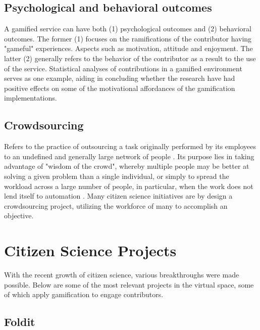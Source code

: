 \subsection{Psychological and behavioral outcomes}

A gamified service can have both (1) psychological outcomes and (2) behavioral outcomes. The former (1) focuses on the ramifications of the contributor having "gameful" experiences. Aspects such as motivation, attitude and enjoyment. The latter (2) generally refers to the behavior of the contributor as a result to the use of the service. Statistical analyses of contributions in a gamified environment serves as one example, aiding in concluding whether the research have had positive effects on some of the motivational affordances of the gamification implementations.

\subsection{Crowdsourcing}

Refers to the practice of outsourcing a task originally performed by its employees to an undefined and generally large network of people \cite{howe2006rise}. Its purpose lies in taking advantage of "wisdom of the crowd", whereby multiple people may be better at solving a given problem than a single individual, or simply to spread the workload across a large number of people, in particular, when the work does not lend itself to automation \cite{kreitmair2019citizen}. Many citizen science initiatives are by design a crowdsourcing project, utilizing the workforce of many to accomplish an objective.

\section{Citizen Science Projects}

With the recent growth of citizen science, various breakthroughs were made possible. Below are some of the most relevant projects in the virtual space, some of which apply gamification to engage contributors.

\subsection{Foldit}

